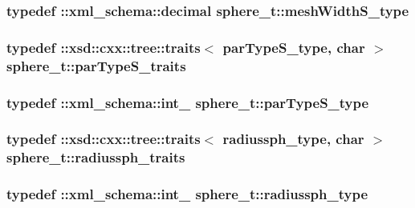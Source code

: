 \hypertarget{classsphere__t_a82740a9c5aa0437d973ee3e3caad09ea}{
\subsubsection[{mesh\-Width\-S\-\_\-type}]{\setlength{\rightskip}{0pt plus 5cm}typedef \-::{\bf xml\-\_\-schema\-::decimal} {\bf sphere\-\_\-t\-::mesh\-Width\-S\-\_\-type}}}\label{classsphere__t_a82740a9c5aa0437d973ee3e3caad09ea}
\hypertarget{classsphere__t_a29b1815b71844784d4fe00e4f5838d17}{
\subsubsection[{par\-Type\-S\-\_\-traits}]{\setlength{\rightskip}{0pt plus 5cm}typedef \-::xsd\-::cxx\-::tree\-::traits$<$ {\bf par\-Type\-S\-\_\-type}, char $>$ {\bf sphere\-\_\-t\-::par\-Type\-S\-\_\-traits}}}\label{classsphere__t_a29b1815b71844784d4fe00e4f5838d17}
\hypertarget{classsphere__t_a750fe86f76f8c344ccb25e7dc73c2655}{
\subsubsection[{par\-Type\-S\-\_\-type}]{\setlength{\rightskip}{0pt plus 5cm}typedef \-::{\bf xml\-\_\-schema\-::int\-\_\-} {\bf sphere\-\_\-t\-::par\-Type\-S\-\_\-type}}}\label{classsphere__t_a750fe86f76f8c344ccb25e7dc73c2655}
\hypertarget{classsphere__t_a75765172215aea8033266e27d5b0af1c}{
\subsubsection[{radiussph\-\_\-traits}]{\setlength{\rightskip}{0pt plus 5cm}typedef \-::xsd\-::cxx\-::tree\-::traits$<$ {\bf radiussph\-\_\-type}, char $>$ {\bf sphere\-\_\-t\-::radiussph\-\_\-traits}}}\label{classsphere__t_a75765172215aea8033266e27d5b0af1c}
\hypertarget{classsphere__t_a81d467c00ec72dc7b9907b521744696d}{
\subsubsection[{radiussph\-\_\-type}]{\setlength{\rightskip}{0pt plus 5cm}typedef \-::{\bf xml\-\_\-schema\-::int\-\_\-} {\bf sphere\-\_\-t\-::radiussph\-\_\-type}}}\label{classsphere__t_a81d467c00ec72dc7b9907b521744696d}
